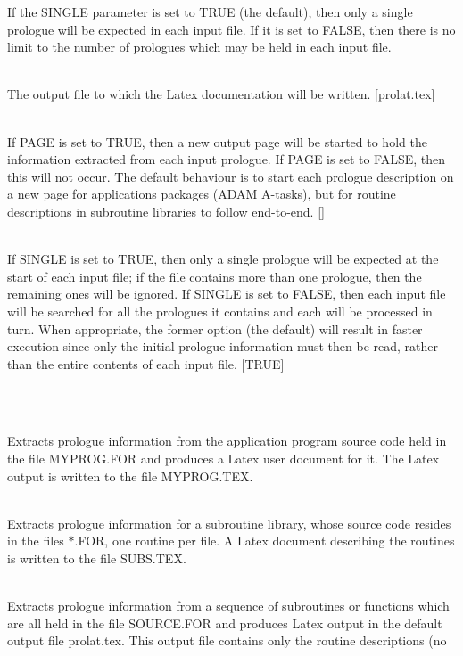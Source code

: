 \documentclass[twoside,11pt]{article}
\renewcommand{\_}{\texttt{\symbol{95}}}
\newlength{\sstexampleslength}
\newcommand{\sstexamples}[1]{
   \item[Examples:] \mbox{} \\
   \vspace{-3.5ex}
   \begin{description}
      #1
   \end{description}
}
\newcommand{\sstsubsection}[1]{ \item[{#1}] \mbox{} \\}
\newcommand{\sstexamplesubsection}[2]{\sloppy
\item[\parbox{\sstexampleslength}{\ssttt #1}] \mbox{} \vspace{1.0ex}
\\ #2 }
\newcommand{\sstexamples}[1]{
      \item[Examples:] \\
      \begin{description}
         #1
      \end{description}
      \\
   }
\newcommand{\sstsubsection}[1]{\item[{#1}]}
\newcommand{\sstexamplesubsection}[2]{\item[{\ssttt #1}] #2}
\begin{document}
{{{         If the SINGLE parameter is set to TRUE (the default), then
         only a single prologue will be expected in each input file. If
         it is set to FALSE, then there is no limit to the number of
         prologues which may be held in each input file.
      }
      \sstsubsection{
         OUT = FILE (Write)
      }{
         The output file to which the Latex documentation will be
         written. [prolat.tex]
      }
      \sstsubsection{
         PAGE = \_LOGICAL (Read)
      }{
         If PAGE is set to TRUE, then a new output page will be started
         to hold the information extracted from each input prologue.
         If PAGE is set to FALSE, then this will not occur.  The
         default behaviour is to start each prologue description on a
         new page for applications packages (ADAM A-tasks), but for
         routine descriptions in subroutine libraries to follow
         end-to-end. []
      }
      \sstsubsection{
         SINGLE = \_LOGICAL (Read)
      }{
         If SINGLE is set to TRUE, then only a single prologue will be
         expected at the start of each input file; if the file contains
         more than one prologue, then the remaining ones will be
         ignored. If SINGLE is set to FALSE, then each input file will
         be searched for all the prologues it contains and each will be
         processed in turn. When appropriate, the former option (the
         default) will result in faster execution since only the
         initial prologue information must then be read, rather than
         the entire contents of each input file.  [TRUE]
      }
   }
   \sstexamples{
      \sstexamplesubsection{
         PROLAT MYPROG.FOR MYPROG.TEX
      }{
         Extracts prologue information from the application program
         source code held in the file MYPROG.FOR and produces a Latex
         user document for it.  The Latex output is written to the file
         MYPROG.TEX.
      }
      \sstexamplesubsection{
         PROLAT $*$.FOR OUT=SUBS.TEX ATASK=FALSE
      }{
         Extracts prologue information for a subroutine library, whose
         source code resides in the files $*$.FOR, one routine per file.
         A Latex document describing the routines is written to the
         file SUBS.TEX.
      }
      \sstexamplesubsection{
         PROLAT IN=SOURCE.FOR NOATASK NODOCUMENT NOSINGLE
      }{
         Extracts prologue information from a sequence of subroutines
         or functions which are all held in the file SOURCE.FOR and
         produces Latex output in the default output file prolat.tex.
         This output file contains only the routine descriptions (no
}}}
\end{document}
